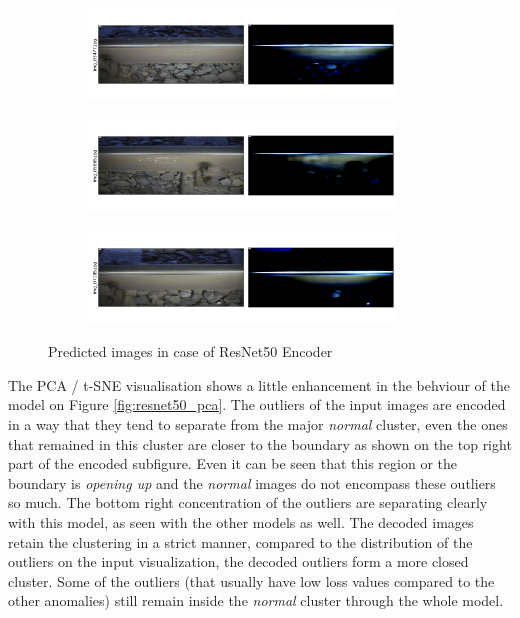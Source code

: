 \begin{figure}[!ht]
    \centering
    \begin{subfigure}{\textwidth}
        \centering
        \includegraphics[width=0.9\textwidth,trim={0 1cm 0 1cm},clip]{./results/resnet50_vgg19/20230514_213740_predict_0.png}
    \end{subfigure}
    \begin{subfigure}{\textwidth}
        \centering
        \includegraphics[width=0.9\textwidth,trim={0 1cm 0 1cm},clip]{./results/resnet50_vgg19/20230514_213740_predict_1.png}
    \end{subfigure}
    \begin{subfigure}{\textwidth}
        \centering
        \includegraphics[width=0.9\textwidth,trim={0 1cm 0 1cm},clip]{./results/resnet50_vgg19/20230514_213740_predict_2.png}
    \end{subfigure}
    \caption{Predicted images in case of ResNet50 Encoder}
    \label{fig:resnet50_examples}
\end{figure}

The PCA / t-SNE visualisation shows a little enhancement in the behviour of the model
on Figure \ref{fig:resnet50_pca}.
The outliers of the input images are encoded in a way that they tend to separate from the
major \emph{normal} cluster, even the ones that remained in this cluster are closer to the boundary
as shown on the top right part of the encoded subfigure.
Even it can be seen that this region or the boundary is \emph{opening up} and the \emph{normal}
images do not encompass these outliers so much.
The bottom right concentration of the outliers are separating clearly with this model,
as seen with the other models as well.
The decoded images retain the clustering in a strict manner, compared to the distribution of the
outliers on the input visualization, the decoded outliers form a more closed cluster.
Some of the outliers (that usually have low loss values compared to the other anomalies) still
remain inside the \emph{normal} cluster through the whole model.

